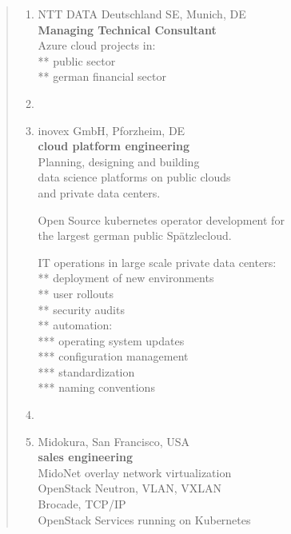 \documentclass[a4paper]{report}
\begin{document}
\begin{quote}
\begin{enumerate}

\item[2024 - 2025]
                    NTT DATA Deutschland SE, Munich, DE\\
                    \textbf{Managing Technical Consultant}\\
                    Azure cloud projects in:\\
                    ** public sector\\
                    ** german financial sector

\item[ ]

\item[2017 - 2023]
                    inovex GmbH, Pforzheim, DE\\
                    \textbf{cloud platform engineering}\\
                    Planning, designing and building\\
                    data science platforms on public clouds\\
                    and private data centers.

                    Open Source kubernetes operator development for\\
                    the largest german public Spätzlecloud.

                    IT operations in large scale private data centers:\\
                    ** deployment of new environments\\
                    ** user rollouts\\
                    ** security audits\\
                    ** automation:\\
                    *** operating system updates\\
                    *** configuration management\\
                    *** standardization\\
                    *** naming conventions

\item[ ]

\item[2014 - 2016]
                    Midokura, San Francisco, USA\\
                    \textbf{sales engineering}\\
                    MidoNet overlay network virtualization\\
                    OpenStack Neutron, VLAN, VXLAN\\
                    Brocade, TCP/IP\\
                    OpenStack Services running on Kubernetes


\end{enumerate}
\end{quote}
\end{document}
